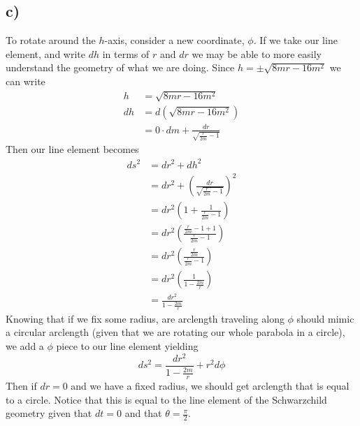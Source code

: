 \documentclass{article}
\theoremstyle{definition}
\begin{document}
\subsection*{c)}
To rotate around the $h$-axis, consider a new coordinate, $\phi$. If we 
take our line element, and write $dh$ in terms of $r$ and $dr$ we may be able to more 
easily understand the geometry of what we are doing.
Since $h = \pm \sqrt{8mr - 16m^2}$ we can write 
\begin{align*}
  h & = \sqrt{8mr - 16m^2} \\
  dh &= d\left( \sqrt{8mr - 16m^2} \right) \\
  &= 0 \cdot dm + \frac{dr}{\sqrt{\frac{r}{2m} - 1}}
\end{align*}
Then our line element becomes
\begin{align*}
  ds^2 &= dr^2 + dh^2 \\
  &= dr^2 +  \left(\frac{dr}{\sqrt{\frac{r}{2m} - 1}}\right)^2 \\
  &= dr^2\left(1 + \frac{1}{\frac{r}{2m} - 1}\right)\\
  &= dr^2 \left(\frac{\frac{r}{2m} - 1 + 1}{\frac{r}{2m}-1}\right)\\
  &= dr^2\left(\frac{\frac{r}{2m}}{\frac{r}{2m}-1}\right)\\
  &=dr^2\left(\frac{1}{1-\frac{2m}{r}}\right)\\
  &=\frac{dr^2}{1-\frac{2m}{r}}
\end{align*}
Knowing that if we fix some radius, are arclength traveling along $\phi$ should mimic
a circular arclength (given that we are rotating our whole parabola in a circle), we add
a $\phi$ piece to our line element yielding
\[
  ds^2 = \frac{dr^2}{1- \frac{2m}{r}} + r^2d\phi
\]
Then if $dr = 0$ and we have a fixed radius, we should get arclength that is equal to a circle.
Notice that this is equal to the line element of the Schwarzchild geometry given that $dt = 0$ and 
that $\theta = \frac{\pi}{2}$.
\end{document}
